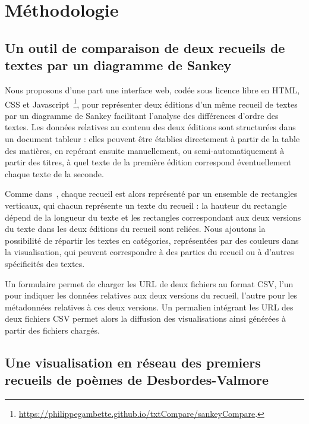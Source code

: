 \documentclass[final, fra]{anthology-ch}     %
\begin{document}
\section{Méthodologie}\label{sec:methodologie}

\subsection{Un outil de comparaison de deux recueils de textes par un diagramme de Sankey}
Nous proposons d'une part une interface web, codée sous licence libre en HTML, CSS et Javascript~\footnote{\url{https://philippegambette.github.io/txtCompare/sankeyCompare}.}, pour représenter deux éditions d'un même recueil de textes par un diagramme de Sankey facilitant l'analyse des différences d'ordre des textes. Les données relatives au contenu des deux éditions sont structurées dans un document tableur : elles peuvent être établies directement à partir de la table des matières, en repérant ensuite manuellement, ou semi-automatiquement à partir des titres, à quel texte de la première édition correspond éventuellement chaque texte de la seconde.

Comme dans~\cite{Eve2016}, chaque recueil est alors représenté par un ensemble de rectangles verticaux, qui chacun représente un texte du recueil : la hauteur du rectangle dépend de la longueur du texte et les rectangles correspondant aux deux versions du texte dans les deux éditions du recueil sont reliées. Nous ajoutons la possibilité de répartir les textes en catégories, représentées par des couleurs dans la visualisation, qui peuvent correspondre à des parties du recueil ou à d'autres spécificités des textes.

Un formulaire permet de charger les URL de deux fichiers au format CSV, l'un pour indiquer les données relatives aux deux versions du recueil, l'autre pour les métadonnées relatives à ces deux versions. Un permalien intégrant les URL des deux fichiers CSV permet alors la diffusion des visualisations ainsi générées à partir des fichiers chargés.

\subsection{Une visualisation en réseau des premiers recueils de poèmes de Desbordes-Valmore}
\end{document}
